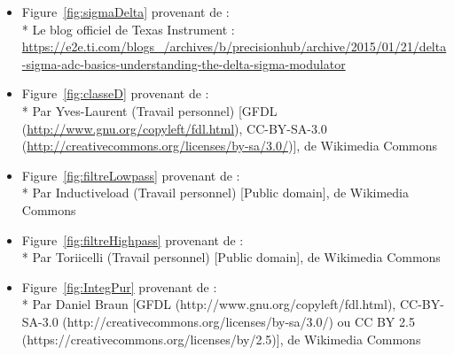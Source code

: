 \documentclass[10pt, oneside, a4paper]{article}
\begin{document}
\begin{itemize}
\item Figure~\ref{fig:sigmaDelta} provenant de :\\*
Le blog officiel de Texas Instrument :
\url{https://e2e.ti.com/blogs_/archives/b/precisionhub/archive/2015/01/21/delta-sigma-adc-basics-understanding-the-delta-sigma-modulator}

\item Figure~\ref{fig:classeD} provenant de :\\*
Par Yves-Laurent (Travail personnel) [GFDL (\url{http://www.gnu.org/copyleft/fdl.html}),
CC-BY-SA-3.0 (\url{http://creativecommons.org/licenses/by-sa/3.0/})], de Wikimedia Commons

\item Figure~\ref{fig:filtreLowpass} provenant de :\\*
Par Inductiveload (Travail personnel) [Public domain], de Wikimedia Commons

\item Figure~\ref{fig:filtreHighpass} provenant de :\\*
Par Toriicelli (Travail personnel) [Public domain], de Wikimedia Commons

\item Figure~\ref{fig:IntegPur} provenant de :\\*
Par Daniel Braun [GFDL (http://www.gnu.org/copyleft/fdl.html),
CC-BY-SA-3.0 (http://creativecommons.org/licenses/by-sa/3.0/) ou
CC BY 2.5 (https://creativecommons.org/licenses/by/2.5)], de Wikimedia Commons
\end{itemize}

{}




\appendix
\clearpage



\end{document}
